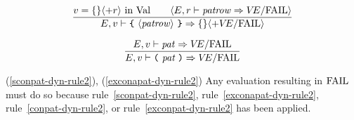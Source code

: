 \replacement{\theidstatus}{\begin{equation}        %
\frac{\E(\longexn)=\V}
     {\E,\V\ts\longexn\ra\emptymap}
\end{equation}}{\begin{equation}        %
\frac{\E(\longvid)=(\V,\is)\qquad\is\neq\isv}
     {\E,\V\ts\longvid\ra\emptymap}
\end{equation}}
\oldpagebreak
{}


\begin{equation}	%
\frac{\V=\emptymap\langle+\r\rangle\ \In\ \Val\qquad
      \langle\E,\r\ts\labpats\ra\VE/\fail\rangle}
     {\E,\V\ts\lttbrace\ \langle\labpats\rangle\ \rttbrace\ra\emptymap\langle+\VE/\fail\rangle}
\end{equation}

\begin{equation}	%
\frac{\E,\V\ts\pat\ra\VE/\fail}
     {\E,\V\ts\parpat\ra\VE/\fail}\index{56.1}
\end{equation}

\comments
\begin{description}
\item{(\ref{sconpat-dyn-rule2}),
\deletion{\theidstatus}{(\ref{conapat-dyn-rule2}),}
(\ref{exconapat-dyn-rule2})}
  Any evaluation resulting in ${\rm FAIL}$ must do so because 
rule~\ref{sconpat-dyn-rule2},
rule~\ref{exconapat-dyn-rule2},
rule~\ref{conpat-dyn-rule2},
or rule~\ref{exconpat-dyn-rule2} has been
applied.
\end{description}

